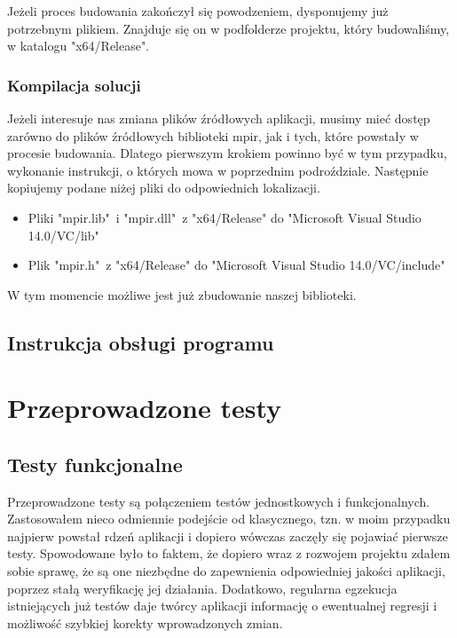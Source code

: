 \documentclass[twoside,a4paper]{book}
\begin{document}
Jeżeli proces budowania zakończył się powodzeniem, dysponujemy już potrzebnym plikiem. Znajduje się on w podfolderze projektu, który budowaliśmy, w katalogu "x64/Release".

\subsection{Kompilacja solucji}

Jeżeli interesuje nas zmiana plików źródłowych aplikacji, musimy mieć dostęp zarówno do plików źródłowych biblioteki mpir, jak i tych, które powstały w procesie budowania. Dlatego pierwszym krokiem powinno być w tym przypadku, wykonanie instrukcji, o których mowa w poprzednim podroździale. Następnie kopiujemy podane niżej pliki do odpowiednich lokalizacji.

\begin{itemize}
	\item Pliki "mpir.lib"\ i "mpir.dll"\ z "x64/Release" do "Microsoft Visual Studio 14.0/VC/lib"
	\item Plik "mpir.h"\ z "x64/Release" do "Microsoft Visual Studio 14.0/VC/include"
\end{itemize}

W tym momencie możliwe jest już zbudowanie naszej biblioteki. 


\section{Instrukcja obsługi programu}



\chapter{Przeprowadzone testy}

\section{Testy funkcjonalne}

Przeprowadzone testy są połączeniem testów jednostkowych i funkcjonalnych. Zastosowałem nieco odmiennie podejście od klasycznego, tzn. w moim przypadku najpierw powstał rdzeń aplikacji i dopiero wówczas zaczęły się pojawiać pierwsze testy. Spowodowane było to faktem, że dopiero wraz z rozwojem projektu zdałem sobie sprawę, że są one niezbędne do zapewnienia odpowiedniej jakości aplikacji, poprzez stałą weryfikację jej działania. Dodatkowo, regularna egzekucja istniejących już testów daje twórcy aplikacji informację o ewentualnej regresji i możliwość szybkiej korekty wprowadzonych zmian.
\end{document}
